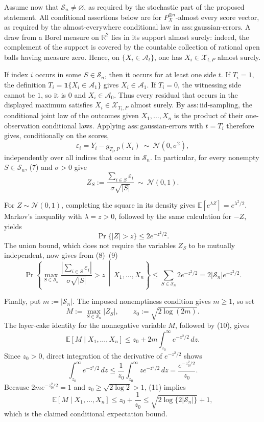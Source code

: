 Assume now that \(\mathscr S_n\ne\varnothing\), as required by the stochastic part of the proposed statement.  All conditional assertions below are for \(P_X^{\otimes n}\)-almost every score vector, as required by the almost-everywhere conditional law in \(\mathrm{ass:gaussian\text{-}errors}\).  A draw from a Borel measure on \(\mathbb R^2\) lies in its support almost surely: indeed, the complement of the support is covered by the countable collection of rational open balls having measure zero.  Hence, on \(\{X_i\in\mathcal A_t\}\), one has \(X_i\in\mathcal X_{t,P}\) almost surely.

If index \(i\) occurs in some \(S\in\mathscr S_n\), then it occurs for at least one side \(t\).  If \(T_i=1\), the definition \(T_i=\mathbf 1\{X_i\in\mathcal A_1\}\) gives \(X_i\in\mathcal A_1\).  If \(T_i=0\), the witnessing side cannot be \(1\), so it is \(0\) and \(X_i\in\mathcal A_0\).  Thus every residual that occurs in the displayed maximum satisfies \(X_i\in\mathcal X_{T_i,P}\) almost surely.  By \(\mathrm{ass:iid\text{-}sampling}\), the conditional joint law of the outcomes given \(X_1,\ldots,X_n\) is the product of their one-observation conditional laws.  Applying \(\mathrm{ass:gaussian\text{-}errors}\) with \(t=T_i\) therefore gives, conditionally on the scores,
\[
 \varepsilon_i=Y_i-g_{T_i,P}(X_i)\ \sim\ \mathcal N(0,\sigma^2), \tag{7}
\]
independently over all indices that occur in \(\mathscr S_n\).  In particular, for every nonempty \(S\in\mathscr S_n\), (7) and \(\sigma>0\) give
\[
 Z_S:=\frac{\sum_{i\in S}\varepsilon_i}{\sigma\sqrt{|S|}}\ \sim\ \mathcal N(0,1). \tag{8}
\]

For \(Z\sim\mathcal N(0,1)\), completing the square in its density gives \(\mathbb E[e^{\lambda Z}]=e^{\lambda^2/2}\).  Markov's inequality with \(\lambda=z>0\), followed by the same calculation for \(-Z\), yields
\[
 \Pr\{|Z|>z\}\le2e^{-z^2/2}. \tag{9}
\]
The union bound, which does not require the variables \(Z_S\) to be mutually independent, now gives from (8)--(9)
\[
 \Pr\left\{\max_{S\in\mathscr S_n}
 \frac{\left|\sum_{i\in S}\varepsilon_i\right|}{\sigma\sqrt{|S|}}>z
 \,\middle|\,X_1,\ldots,X_n\right\}
 \le\sum_{S\in\mathscr S_n}2e^{-z^2/2}
 =2|\mathscr S_n|e^{-z^2/2}. \tag{10}
\]

Finally, put \(m:=|\mathscr S_n|\).  The imposed nonemptiness condition gives \(m\ge1\), so set
\[
 M:=\max_{S\in\mathscr S_n}|Z_S|,\qquad
 z_0:=\sqrt{2\log(2m)}.
\]
The layer-cake identity for the nonnegative variable \(M\), followed by (10), gives
\[
 \mathbb E[M\mid X_1,\ldots,X_n]
 \le z_0+2m\int_{z_0}^{\infty}e^{-z^2/2}\,dz. \tag{11}
\]
Since \(z_0>0\), direct integration of the derivative of \(e^{-z^2/2}\) shows
\[
 \int_{z_0}^{\infty}e^{-z^2/2}\,dz
 \le \frac{1}{z_0}\int_{z_0}^{\infty}z e^{-z^2/2}\,dz
 =\frac{e^{-z_0^2/2}}{z_0}.
\]
Because \(2m e^{-z_0^2/2}=1\) and \(z_0\ge\sqrt{2\log2}>1\), (11) implies
\[
 \mathbb E[M\mid X_1,\ldots,X_n]\le z_0+\frac1{z_0}\le\sqrt{2\log\{2|\mathscr S_n|\}}+1,
\]
which is the claimed conditional expectation bound.